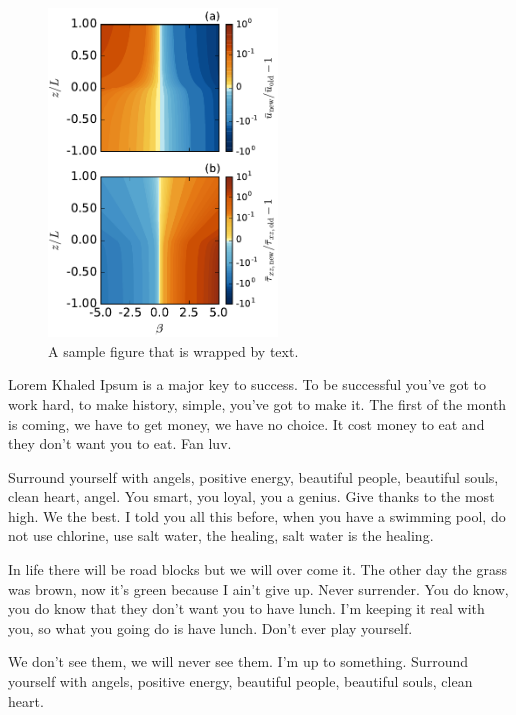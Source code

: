 \setlength\intextsep{0pt}
\begin{figure}
\vspace{-5pt}
\centering
\includegraphics[width=2.4in]{figures/sample1}
\caption{A sample figure that is wrapped by text.}
\label{fig1}
\end{figure}

Lorem Khaled Ipsum is a major key to success. To be successful you've got to work hard, to make history, simple, you've got to make it. The first of the month is coming, we have to get money, we have no choice. It cost money to eat and they don't want you to eat. Fan luv. 

Surround yourself with angels, positive energy, beautiful people, beautiful souls, clean heart, angel. You smart, you loyal, you a genius. Give thanks to the most high. We the best. I told you all this before, when you have a swimming pool, do not use chlorine, use salt water, the healing, salt water is the healing.

In life there will be road blocks but we will over come it. The other day the grass was brown, now it's green because I ain't give up. Never surrender. You do know, you do know that they don't want you to have lunch. I'm keeping it real with you, so what you going do is have lunch. Don't ever play yourself. 

We don't see them, we will never see them. I'm up to something. Surround yourself with angels, positive energy, beautiful people, beautiful souls, clean heart.

